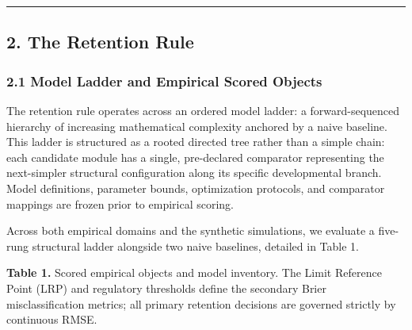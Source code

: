\documentclass[11pt]{article}
\begin{document}
\begin{center}\rule{0.5\linewidth}{0.5pt}\end{center}

\subsection{2. The Retention Rule}\label{the-retention-rule}

\subsubsection{2.1 Model Ladder and Empirical Scored
Objects}\label{model-ladder-and-empirical-scored-objects}

The retention rule operates across an ordered model ladder: a
forward-sequenced hierarchy of increasing mathematical complexity
anchored by a naive baseline. This ladder is structured as a rooted
directed tree rather than a simple chain: each candidate module has a
single, pre-declared comparator representing the next-simpler structural
configuration along its specific developmental branch. Model
definitions, parameter bounds, optimization protocols, and comparator
mappings are frozen prior to empirical scoring.

Across both empirical domains and the synthetic simulations, we evaluate
a five-rung structural ladder alongside two naive baselines, detailed in
Table 1.

\textbf{Table 1.} Scored empirical objects and model inventory. The
Limit Reference Point (LRP) and regulatory thresholds define the
secondary Brier misclassification metrics; all primary retention
decisions are governed strictly by continuous RMSE.
\end{document}
